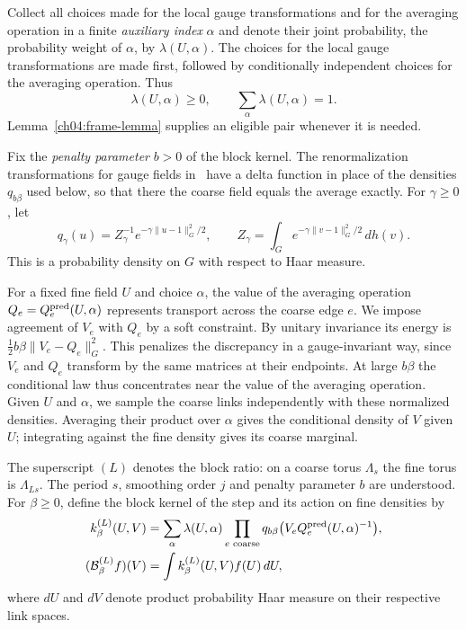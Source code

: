

Collect all choices made for the local gauge transformations and for the averaging operation in a finite \emph{auxiliary index} $\alpha$ and
denote their joint probability, the probability weight of $\alpha$, by $\lambda(U,\alpha)$. The choices for the local gauge transformations are
made first, followed by conditionally independent choices for the averaging operation. Thus
\begin{equation}
 \lambda(U,\alpha)\ge0,\qquad \sum_\alpha\lambda(U,\alpha)=1.
 \label{ch04:tag-law}
\end{equation}
Lemma~\ref{ch04:frame-lemma} supplies an eligible pair whenever it is needed.

Fix the \emph{penalty parameter} $b>0$ of the block kernel. The renormalization transformations for gauge fields in~\cite{Balaban1984Propagators,Balaban1985Averaging,Balaban1987RG} have a delta function in place of the densities $q_{b\beta}$ used below, so that there the coarse field equals the average exactly. For $\gamma\ge0$, let
\[
 q_\gamma(u)=Z_\gamma^{-1}e^{-\gamma\|u-1\|_G^2/2},\qquad
 Z_\gamma=\int_G e^{-\gamma\|v-1\|_G^2/2}\,dh(v).
\]
This is a probability density on $G$ with respect to Haar measure.

For a fixed fine field $U$ and choice $\alpha$, the value of the averaging operation
$Q_e=Q_e^{\rm pred}(U,\alpha)$ represents transport across the coarse
edge $e$. We impose agreement of $V_e$ with $Q_e$ by a soft constraint.
By unitary invariance its energy is $\tfrac12 b\beta\|V_e-Q_e\|_G^2$.
This penalizes the discrepancy in a gauge-invariant way, since $V_e$
and $Q_e$ transform by the same matrices at their endpoints. At large
$b\beta$ the conditional law thus concentrates near the value of the averaging operation.
Given $U$ and $\alpha$, we sample the coarse links independently with
these normalized densities. Averaging their product over $\alpha$ gives
the conditional density of $V$ given $U$; integrating against the fine
density gives its coarse marginal.

\begin{definition}
\label{ch04:block-map}
The superscript $(L)$ denotes the block ratio: on a coarse torus
$\Lambda_s$ the fine torus is $\Lambda_{Ls}$. The period $s$, smoothing
order $j$ and penalty parameter $b$ are understood. For $\beta\ge0$, define the
block kernel of the step and its action on fine densities by
\begin{align}
 k^{(L)}_\beta(U,V)
   &=\sum_\alpha\lambda(U,\alpha)
        \prod_{e\text{ coarse}}
           q_{b\beta}\bigl(V_eQ_e^{\rm pred}(U,\alpha)^{-1}\bigr),
 \label{ch04:kernel}\\
 (\mathcal B^{(L)}_\beta f)(V)
   &=\int k^{(L)}_\beta(U,V)f(U)\,dU,
 \label{ch04:block-operator}
\end{align}
where $dU$ and $dV$ denote product probability Haar measure on their
respective link spaces.
\end{definition}

